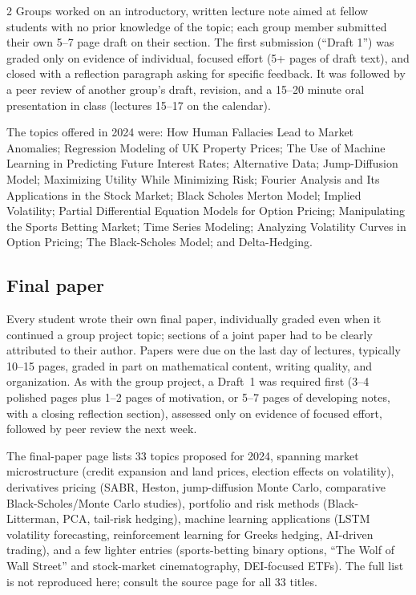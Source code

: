 \begin{paracol}{2}
Groups worked on an introductory, written lecture note aimed at fellow students with no prior
knowledge of the topic; each group member submitted their own 5--7 page draft on their section. The
first submission (``Draft 1'') was graded only on evidence of individual, focused effort (5+ pages
of draft text), and closed with a reflection paragraph asking for specific feedback. It was followed
by a peer review of another group's draft, revision, and a 15--20 minute oral presentation in class
(lectures 15--17 on the calendar).

The topics offered in 2024 were: How Human Fallacies Lead to Market Anomalies; Regression Modeling
of UK Property Prices; The Use of Machine Learning in Predicting Future Interest Rates; Alternative
Data; Jump-Diffusion Model; Maximizing Utility While Minimizing Risk; Fourier Analysis and Its
Applications in the Stock Market; Black Scholes Merton Model; Implied Volatility; Partial
Differential Equation Models for Option Pricing; Manipulating the Sports Betting Market; Time
Series Modeling; Analyzing Volatility Curves in Option Pricing; The Black-Scholes Model; and
Delta-Hedging.

\subsection{Final paper}

Every student wrote their own final paper, individually graded even when it continued a group
project topic; sections of a joint paper had to be clearly attributed to their author. Papers were
due on the last day of lectures, typically 10--15 pages, graded in part on mathematical content,
writing quality, and organization. As with the group project, a Draft~1 was required first (3--4
polished pages plus 1--2 pages of motivation, or 5--7 pages of developing notes, with a closing
reflection section), assessed only on evidence of focused effort, followed by peer review the next
week.

The final-paper page lists 33 topics proposed for 2024, spanning market microstructure (credit
expansion and land prices, election effects on volatility), derivatives pricing (SABR, Heston,
jump-diffusion Monte Carlo, comparative Black-Scholes/Monte Carlo studies), portfolio and risk
methods (Black-Litterman, PCA, tail-risk hedging), machine learning applications (LSTM volatility
forecasting, reinforcement learning for Greeks hedging, AI-driven trading), and a few lighter
entries (sports-betting binary options, ``The Wolf of Wall Street'' and stock-market cinematography,
DEI-focused ETFs). The full list is not reproduced here; consult the source page for all 33 titles.


\end{paracol}
